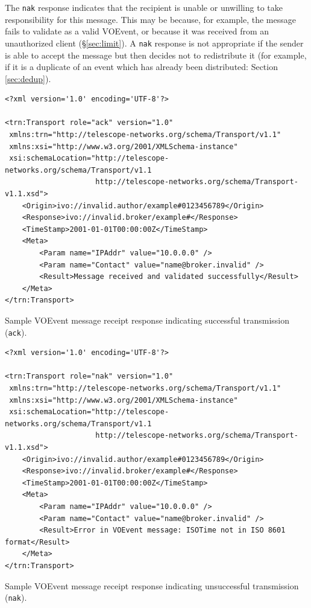 \documentclass[a4paper,11pt]{ivoa}
\begin{document}
The \texttt{nak} response indicates that the recipient is unable or unwilling
to take responsibility for this message. This may be because, for example, the
message fails to validate as a valid VOEvent, or because it was received from
an unauthorized client (\S\ref{sec:limit}). A \texttt{nak} response is not
appropriate if the sender is able to accept the message but then decides not
to redistribute it (for example, if it is a duplicate of an event which has
already been distributed: Section \ref{sec:dedup}).

\begin{listing*}
\begin{verbatim}
<?xml version='1.0' encoding='UTF-8'?>

<trn:Transport role="ack" version="1.0"
 xmlns:trn="http://telescope-networks.org/schema/Transport/v1.1"
 xmlns:xsi="http://www.w3.org/2001/XMLSchema-instance"
 xsi:schemaLocation="http://telescope-networks.org/schema/Transport/v1.1
                     http://telescope-networks.org/schema/Transport-v1.1.xsd">
    <Origin>ivo://invalid.author/example#0123456789</Origin>
    <Response>ivo://invalid.broker/example#</Response>
    <TimeStamp>2001-01-01T00:00:00Z</TimeStamp>
    <Meta>
        <Param name="IPAddr" value="10.0.0.0" />
        <Param name="Contact" value="name@broker.invalid" />
        <Result>Message received and validated successfully</Result>
    </Meta>
</trn:Transport>
\end{verbatim}
\caption{Sample VOEvent message receipt response indicating successful
transmission (\texttt{ack}).}
\label{lst:ack}
\end{listing*}

\begin{listing*}
\begin{verbatim}
<?xml version='1.0' encoding='UTF-8'?>

<trn:Transport role="nak" version="1.0"
 xmlns:trn="http://telescope-networks.org/schema/Transport/v1.1"
 xmlns:xsi="http://www.w3.org/2001/XMLSchema-instance"
 xsi:schemaLocation="http://telescope-networks.org/schema/Transport/v1.1
                     http://telescope-networks.org/schema/Transport-v1.1.xsd">
    <Origin>ivo://invalid.author/example#0123456789</Origin>
    <Response>ivo://invalid.broker/example#</Response>
    <TimeStamp>2001-01-01T00:00:00Z</TimeStamp>
    <Meta>
        <Param name="IPAddr" value="10.0.0.0" />
        <Param name="Contact" value="name@broker.invalid" />
        <Result>Error in VOEvent message: ISOTime not in ISO 8601 format</Result>
    </Meta>
</trn:Transport>
\end{verbatim}
\caption{Sample VOEvent message receipt response indicating unsuccessful
transmission (\texttt{nak}).}
\label{lst:nak}
\end{listing*}
\end{document}
